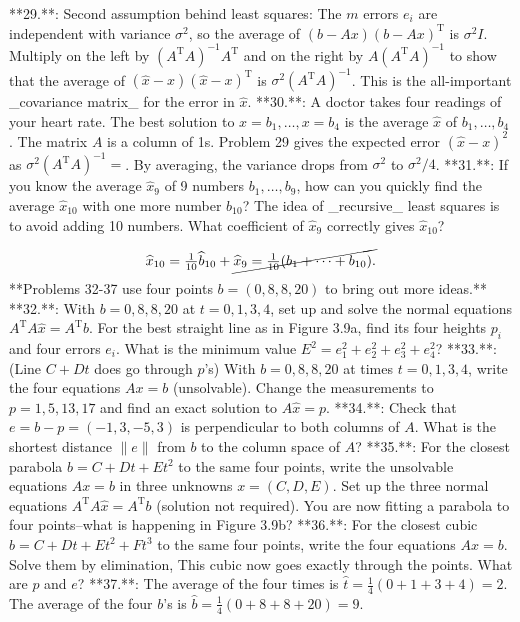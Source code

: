 

**29.**: Second assumption behind least squares: The \(m\) errors \(e_{i}\) are independent with variance \(\sigma^{2}\), so the average of \((b-Ax)(b-Ax)^{\mathrm{T}}\) is \(\sigma^{2}I\). Multiply on the left by \((A^{\mathrm{T}}A)^{-1}A^{\mathrm{T}}\) and on the right by \(A(A^{\mathrm{T}}A)^{-1}\) to show that the average of \((\widehat{x}-x)(\widehat{x}-x)^{\mathrm{T}}\) is \(\sigma^{2}(A^{\mathrm{T}}A)^{-1}\). This is the all-important _covariance matrix_ for the error in \(\widehat{x}\).
**30.**: A doctor takes four readings of your heart rate. The best solution to \(x=b_{1},\ldots,x=b_{4}\) is the average \(\widehat{x}\) of \(b_{1},\ldots,b_{4}\). The matrix \(A\) is a column of 1s. Problem 29 gives the expected error \((\widehat{x}-x)^{2}\) as \(\sigma^{2}(A^{\mathrm{T}}A)^{-1}=\). By averaging, the variance drops from \(\sigma^{2}\) to \(\sigma^{2}/4\).
**31.**: If you know the average \(\widehat{x}_{9}\) of 9 numbers \(b_{1},\ldots,b_{9}\), how can you quickly find the average \(\widehat{x}_{10}\) with one more number \(b_{10}\)? The idea of _recursive_ least squares is to avoid adding 10 numbers. What coefficient of \(\widehat{x}_{9}\) correctly gives \(\widehat{x}_{10}\)?

\[\widehat{x}_{10}=\tfrac{1}{10}\widehat{b}_{10}+\cancel{\widehat{x}_{9}= \tfrac{1}{10}(b_{1}+\cdots+b_{10}).}\]
**Problems 32-37 use four points \(b=(0,8,8,20)\) to bring out more ideas.**
**32.**: With \(b=0,8,8,20\) at \(t=0,1,3,4\), set up and solve the normal equations \(A^{\mathrm{T}}A\widehat{x}=A^{\mathrm{T}}b\). For the best straight line as in Figure 3.9a, find its four heights \(p_{i}\) and four errors \(e_{i}\). What is the minimum value \(E^{2}=e_{1}^{2}+e_{2}^{2}+e_{3}^{2}+e_{4}^{2}\)?
**33.**: (Line \(C+Dt\) does go through \(p\)'s) With \(b=0,8,8,20\) at times \(t=0,1,3,4\), write the four equations \(Ax=b\) (unsolvable). Change the measurements to \(p=1,5,13,17\) and find an exact solution to \(A\widehat{x}=p\).
**34.**: Check that \(e=b-p=(-1,3,-5,3)\) is perpendicular to both columns of \(A\). What is the shortest distance \(\|e\|\) from \(b\) to the column space of \(A\)?
**35.**: For the closest parabola \(b=C+Dt+Et^{2}\) to the same four points, write the unsolvable equations \(Ax=b\) in three unknowns \(x=(C,D,E)\). Set up the three normal equations \(A^{\mathrm{T}}A\widehat{x}=A^{\mathrm{T}}b\) (solution not required). You are now fitting a parabola to four points--what is happening in Figure 3.9b?
**36.**: For the closest cubic \(b=C+Dt+Et^{2}+Ft^{3}\) to the same four points, write the four equations \(Ax=b\). Solve them by elimination, This cubic now goes exactly through the points. What are \(p\) and \(e\)?
**37.**: The average of the four times is \(\widehat{t}=\tfrac{1}{4}(0+1+3+4)=2\). The average of the four \(b\)'s is \(\widehat{b}=\tfrac{1}{4}(0+8+8+20)=9\).

